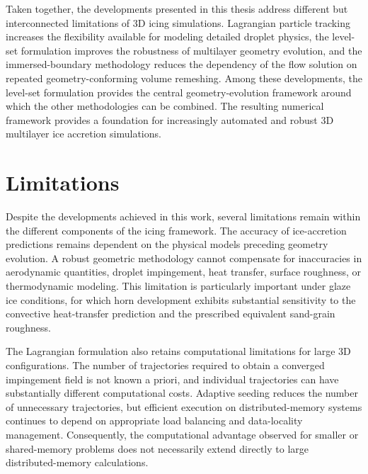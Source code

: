 Taken together, the developments presented in this thesis address different but interconnected limitations of 3D icing simulations. Lagrangian particle tracking increases the flexibility available for modeling detailed droplet physics, the level-set formulation improves the robustness of multilayer geometry evolution, and the immersed-boundary methodology reduces the dependency of the flow solution on repeated geometry-conforming volume remeshing. Among these developments, the level-set formulation provides the central geometry-evolution framework around which the other methodologies can be combined. The resulting numerical framework provides a foundation for increasingly automated and robust 3D multilayer ice accretion simulations.

\section{Limitations}\label{sec:Limitations}

Despite the developments achieved in this work, several limitations remain within the different components of the icing framework. The accuracy of ice-accretion predictions remains dependent on the physical models preceding geometry evolution. A robust geometric methodology cannot compensate for inaccuracies in aerodynamic quantities, droplet impingement, heat transfer, surface roughness, or thermodynamic modeling. This limitation is particularly important under glaze ice conditions, for which horn development exhibits substantial sensitivity to the convective heat-transfer prediction and the prescribed equivalent sand-grain roughness.

The Lagrangian formulation also retains computational limitations for large 3D configurations. The number of trajectories required to obtain a converged impingement field is not known a priori, and individual trajectories can have substantially different computational costs. Adaptive seeding reduces the number of unnecessary trajectories, but efficient execution on distributed-memory systems continues to depend on appropriate load balancing and data-locality management. Consequently, the computational advantage observed for smaller or shared-memory problems does not necessarily extend directly to large distributed-memory calculations.



